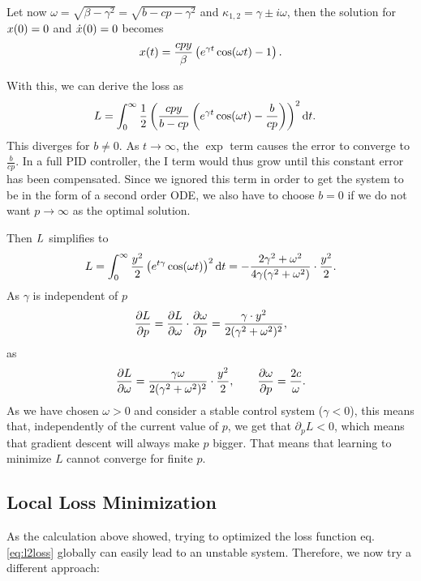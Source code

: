 \documentclass{article}
\begin{document}
    Let now $\omega=\sqrt{\beta-\gamma^2} = \sqrt{b - cp - \gamma^2}$ and  $\kappa_{1,2} = \gamma \pm i \omega$, then the solution for 
    $x(0) = 0$ and $\dot{x}(0) = 0$ becomes
    \begin{align}
        x(t) = \frac{c p y}{\beta} \left( e^{\gamma t} \cos(\omega t) - 1 \right).
    \end{align}

    With this, we can derive the loss as 
    \begin{align}
        L &= \int_0^{\infty} \frac{1}{2}\left( \frac{c p y}{b - cp} \left(e^{\gamma t} \cos ( \omega t ) - \frac{b}{c p}\right) \right)^2 \mathrm{d}t.
    \end{align}
    This diverges for $b \neq 0$. As $t \rightarrow \infty$, the $\exp$ term causes the error to converge to $\frac{b}{c p}$. 
    In a full PID controller, the I term would thus grow until this constant error has been compensated. 
    Since we ignored this term in order to get the system to be in the form of a second order ODE, 
    we also have to choose $b=0$ if we do not want $p \rightarrow \infty$ as the optimal solution.

    Then $L$ simplifies to
    \begin{align}
        L = \int_0^{\infty} \frac{y^2}{2}\left(e^{t\gamma} \cos (\omega t ) \right)^2 \mathrm{d}t = -\frac{2 \gamma^2 + \omega^2}{4 \gamma (\gamma^2 + \omega^2)} \cdot \frac{y^2}{2}.
    \end{align}
   As $\gamma$ is independent of $p$
    \begin{align}
        \frac{\partial L}{\partial p} = \frac{\partial L}{\partial \omega} \cdot \frac{\partial \omega}{\partial p} = \frac{\gamma \cdot y^2}{2 (\gamma^2 + \omega^2)^2},
    \end{align}
    as 
    \begin{align}
         \frac{\partial L}{\partial \omega} = \frac{\gamma \omega}{2 (\gamma^2 + \omega^2)^2} \cdot \frac{y^2}{2}, \qquad
         \frac{\partial \omega}{\partial p} = \frac{2 c}{\omega}.
    \end{align}
    As we have chosen $\omega >0$ and consider a stable control system ($\gamma < 0$), this means that, 
    independently of the current value of $p$, we get that $\partial_p L < 0$, 
    which means that gradient descent will always make $p$ bigger. 
    That means that learning to minimize $L$ cannot converge for finite $p$.

  \subsection{Local Loss Minimization}
    As the calculation above showed, trying to optimized the loss function eq. \eqref{eq:l2loss} globally can easily
    lead to an unstable system. Therefore, we now try a different approach:
\end{document}
